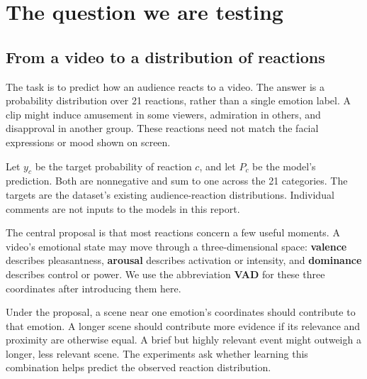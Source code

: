 \documentclass[11pt,a4paper]{article}
\begin{document}
\hypersetup{pageanchor=true}
\tableofcontents
\clearpage
{}

\section{The question we are testing}
\subsection{From a video to a distribution of reactions}
The task is to predict how an audience reacts to a video. The answer is a probability distribution over 21 reactions, rather than a single emotion label. A clip might induce amusement in some viewers, admiration in others, and disapproval in another group. These reactions need not match the facial expressions or mood shown on screen.

Let $y_c$ be the target probability of reaction $c$, and let $P_c$ be the model's prediction. Both are nonnegative and sum to one across the 21 categories. The targets are the dataset's existing audience-reaction distributions. Individual comments are not inputs to the models in this report.

The central proposal is that most reactions concern a few useful moments. A video's emotional state may move through a three-dimensional space: \textbf{valence} describes pleasantness, \textbf{arousal} describes activation or intensity, and \textbf{dominance} describes control or power. We use the abbreviation \textbf{VAD} for these three coordinates after introducing them here.

Under the proposal, a scene near one emotion's coordinates should contribute to that emotion. A longer scene should contribute more evidence if its relevance and proximity are otherwise equal. A brief but highly relevant event might outweigh a longer, less relevant scene. The experiments ask whether learning this combination helps predict the observed reaction distribution.
\end{document}
